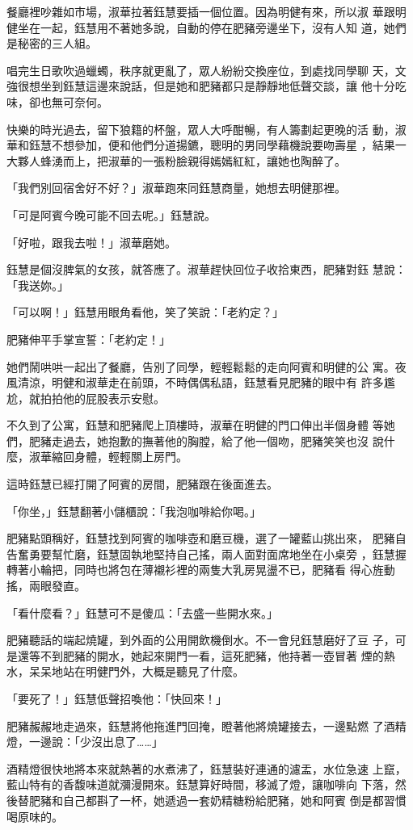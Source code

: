 餐廳裡吵雜如市場，淑華拉著鈺慧要插一個位置。因為明健有來，所以淑
華跟明健坐在一起，鈺慧用不著她多說，自動的停在肥豬旁邊坐下，沒有人知
道，她們是秘密的三人組。

唱完生日歌吹過蠟蠋，秩序就更亂了，眾人紛紛交換座位，到處找同學聊
天，文強很想坐到鈺慧這邊來說話，但是她和肥豬都只是靜靜地低聲交談，讓
他十分吃味，卻也無可奈何。

快樂的時光過去，留下狼籍的杯盤，眾人大呼酣暢，有人籌劃起更晚的活
動，淑華和鈺慧不想參加，便和他們分道揚鑣，聰明的男同學藉機說要吻壽星
，結果一大夥人蜂湧而上，把淑華的一張粉臉親得嫣嫣紅紅，讓她也陶醉了。

「我們別回宿舍好不好？」淑華跑來同鈺慧商量，她想去明健那裡。

「可是阿賓今晚可能不回去呢。」鈺慧說。

「好啦，跟我去啦！」淑華磨她。

鈺慧是個沒脾氣的女孩，就答應了。淑華趕快回位子收拾東西，肥豬對鈺
慧說：「我送妳。」

「可以啊！」鈺慧用眼角看他，笑了笑說：「老約定？」

肥豬伸平手掌宣誓：「老約定！」

她們鬧哄哄一起出了餐廳，告別了同學，輕輕鬆鬆的走向阿賓和明健的公
寓。夜風清涼，明健和淑華走在前頭，不時偶偶私語，鈺慧看見肥豬的眼中有
許多尷尬，就拍拍他的屁股表示安慰。

不久到了公寓，鈺慧和肥豬爬上頂樓時，淑華在明健的門口伸出半個身體
等她們，肥豬走過去，她抱歉的撫著他的胸膛，給了他一個吻，肥豬笑笑也沒
說什麼，淑華縮回身體，輕輕關上房門。

這時鈺慧已經打開了阿賓的房間，肥豬跟在後面進去。

「你坐，」鈺慧翻著小儲櫃說：「我泡咖啡給你喝。」

肥豬點頭稱好，鈺慧找到阿賓的咖啡壺和磨豆機，選了一罐藍山挑出來，
肥豬自告奮勇要幫忙磨，鈺慧固執地堅持自己搖，兩人面對面席地坐在小桌旁
，鈺慧握轉著小輪把，同時也將包在薄襯衫裡的兩隻大乳房晃盪不已，肥豬看
得心旌動搖，兩眼發直。

「看什麼看？」鈺慧可不是傻瓜：「去盛一些開水來。」

肥豬聽話的端起燒罐，到外面的公用開飲機倒水。不一會兒鈺慧磨好了豆
子，可是還等不到肥豬的開水，她起來開門一看，這死肥豬，他持著一壺冒著
煙的熱水，呆呆地站在明健門外，大概是聽見了什麼。

「要死了！」鈺慧低聲招喚他：「快回來！」

肥豬赧赧地走過來，鈺慧將他拖進門回掩，瞪著他將燒罐接去，一邊點燃
了酒精燈，一邊說：「少沒出息了……」

酒精燈很快地將本來就熱著的水煮沸了，鈺慧裝好連通的濾盂，水位急速
上竄，藍山特有的香馥味道就瀰漫開來。鈺慧算好時間，移滅了燈，讓咖啡向
下落，然後替肥豬和自己都斟了一杯，她遞過一套奶精糖粉給肥豬，她和阿賓
倒是都習慣喝原味的。

